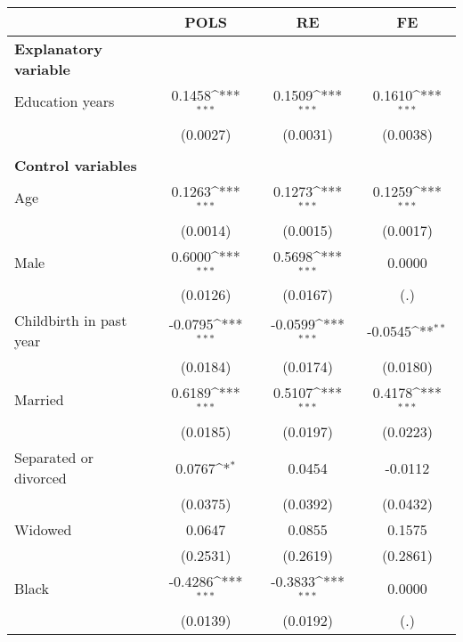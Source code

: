 {
\def\sym#1{\ifmmode^{#1}\else\(^{#1}\)\fi}
\begin{tabular}{l*{3}{c}}
\toprule
                    &\multicolumn{1}{c}{POLS}&\multicolumn{1}{c}{RE}&\multicolumn{1}{c}{FE}\\
\midrule
\textbf{Explanatory variable}&                     &                     &                     \\
Education years     &      0.1458\sym{***}&      0.1509\sym{***}&      0.1610\sym{***}\\
                    &    (0.0027)         &    (0.0031)         &    (0.0038)         \\
\\ \textbf{Control variables}&                     &                     &                     \\
Age                 &      0.1263\sym{***}&      0.1273\sym{***}&      0.1259\sym{***}\\
                    &    (0.0014)         &    (0.0015)         &    (0.0017)         \\
Male                &      0.6000\sym{***}&      0.5698\sym{***}&      0.0000         \\
                    &    (0.0126)         &    (0.0167)         &         (.)         \\
Childbirth in past year&     -0.0795\sym{***}&     -0.0599\sym{***}&     -0.0545\sym{**} \\
                    &    (0.0184)         &    (0.0174)         &    (0.0180)         \\
Married             &      0.6189\sym{***}&      0.5107\sym{***}&      0.4178\sym{***}\\
                    &    (0.0185)         &    (0.0197)         &    (0.0223)         \\
Separated or divorced&      0.0767\sym{*}  &      0.0454         &     -0.0112         \\
                    &    (0.0375)         &    (0.0392)         &    (0.0432)         \\
Widowed             &      0.0647         &      0.0855         &      0.1575         \\
                    &    (0.2531)         &    (0.2619)         &    (0.2861)         \\
Black               &     -0.4286\sym{***}&     -0.3833\sym{***}&      0.0000         \\
                    &    (0.0139)         &    (0.0192)         &         (.)         \\

\end{tabular}}
